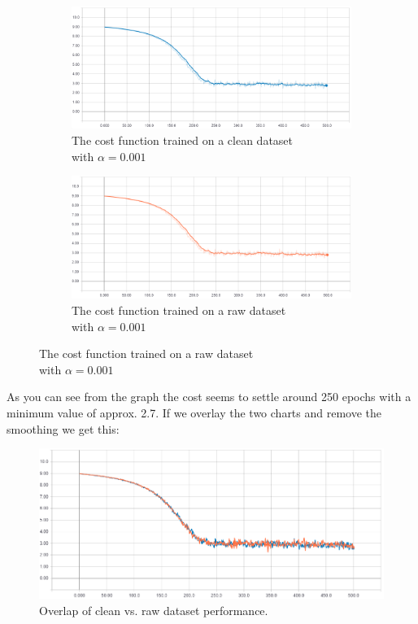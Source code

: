 \documentclass[titlepage]{article}
\begin{document}
\begin{figure}[H]
	\centering
	\begin{subfigure}[b]{0.4\linewidth}
		\centering
		\includegraphics[width=\linewidth]{images/cost-clean-001.png}
		\caption{The cost function trained on a clean dataset\\with $\alpha = 0.001$}
	\end{subfigure}
	\begin{subfigure}[b]{0.4\linewidth}
		\centering
		\includegraphics[width=\linewidth]{images/cost-raw-001.png}
		\caption{The cost function trained on a raw dataset\\with $\alpha = 0.001$}
	\end{subfigure}
	\label{fig:ccr001}
\end{figure}
As you can see from the graph the cost seems to settle around 250 epochs with a minimum value of approx. 2.7. If we overlay the two charts and remove the smoothing we get this:
\begin{figure}[H]
	\centering
	\includegraphics[width=120mm]{images/cost-overlap-001.png}
	\caption{Overlap of clean vs. raw dataset performance.}
	\label{fig:co001}
\end{figure}
\end{document}
